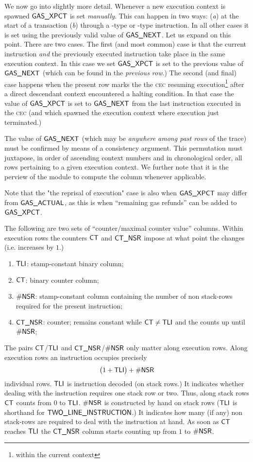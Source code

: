 We now go into slightly more detail. Whenever a new execution context is spawned $\textsf{GAS}\textsf{\_XPCT}$ is set \emph{manually}. This can happen in two ways: 
(\emph{a}) at the start of a transaction
(\emph{b}) through a -type or -type instruction.
In all other cases it is set using the previously valid value of $\textsf{GAS}\textsf{\_NEXT}$. Let us expand on this point. There are two cases.
The first (and most common) case is that the current instruction \emph{and} the previously executed instruction take place in the same execution context.
In this case we set $\textsf{GAS}\textsf{\_XPCT}$ is set to the previous value of $\textsf{GAS}\textsf{\_NEXT}$ (which can be found in the \emph{previous row}.)
The second (and final) case happens when the present row marks the the \textsc{cec} resuming execution\footnote{within the current context} after a direct descendant context encountered a halting condition.
In that case the value of $\textsf{GAS}\textsf{\_XPCT}$ is set to $\textsf{GAS}\textsf{\_NEXT}$ from the last instruction executed in the \textsc{cec} (and which spawned the execution context where execution just terminated.)

\saNote{}
The value of $\textsf{GAS}\textsf{\_NEXT}$ (which may be \emph{anywhere among past rows} of the trace) must be confirmed by means of a consistency argument.
This permutation must juxtapose, in order of ascending context numbers and in chronological order, all rows pertaining to a given execution context.
We further note that it is the perview of the \stpMod{} module to compute the \gasStipend{} column whenever applicable.

Note that the "the reprisal of execution" case is also when $\textsf{GAS}\textsf{\_XPCT}$ may differ from $\textsf{GAS}\textsf{\_ACTUAL}$, as this is when ``remaining gas refunds'' can be added to $\textsf{GAS}\textsf{\_XPCT}$.

The following are two sets of ``counter/maximal counter value'' columns. Within execution rows the counters $\textsf{CT}$ and $\textsf{CT}\textsf{\_NSR}$ impose at what point the \hubStamp{} changes (i.e. increases by $1$.)
\begin{enumerate}[resume]
	\item $\textsf{TLI}{}$:
		stamp-constant binary column;
	\item $\textsf{CT}$:
		binary counter column;
	\item $\textsf{\#NSR}$:
		stamp-constant column containing the number of non stack-rows required for the present instruction;
	\item $\textsf{CT}\textsf{\_NSR}$:
		counter; remains constant while $\textsf{CT}\neq\textsf{TLI}$ and the counts up until $\textsf{\#NSR}$;
\end{enumerate}
The pairs
$\textsf{CT}$/$\textsf{TLI}$ and
$\textsf{CT}\textsf{\_NSR}$/$\textsf{\#NSR}$
only matter along execution rows.
Along execution rows an instruction occupies precisely
\[
	\big( 1 + \textsf{TLI} \big) + \textsf{\#NSR}
\]
individual rows.
$\textsf{TLI}$ is instruction decoded (on stack rows.)
It indicates whether dealing with the instruction requires one stack row or two.
Thus, along stack rows $\textsf{CT}$ counts from $0$ to $\textsf{TLI}$.
$\textsf{\#NSR}$ is constructed by hand on stack rows ($\textsf{TLI}$ is shorthand for $\textsf{TWO\_LINE\_INSTRUCTION}{}$.)
It indicates how many (if any) non stack-rows are required to deal with the instruction at hand.
As soon as $\textsf{CT}$ reaches $\textsf{TLI}$ the $\textsf{CT}\textsf{\_NSR}$ column starts counting up from $1$ to $\textsf{\#NSR}$.

